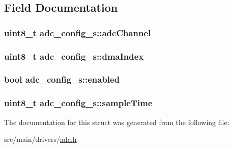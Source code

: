 \subsection{Field Documentation}
\hypertarget{structadc__config__s_a0a1d73295fd9feb39b84ffba25547cff}{
\subsubsection[{adc\+Channel}]{\setlength{\rightskip}{0pt plus 5cm}uint8\+\_\+t adc\+\_\+config\+\_\+s\+::adc\+Channel}}\label{structadc__config__s_a0a1d73295fd9feb39b84ffba25547cff}
\hypertarget{structadc__config__s_aeda4d4bb3b47c2f32be4e4cb985a083a}{
\subsubsection[{dma\+Index}]{\setlength{\rightskip}{0pt plus 5cm}uint8\+\_\+t adc\+\_\+config\+\_\+s\+::dma\+Index}}\label{structadc__config__s_aeda4d4bb3b47c2f32be4e4cb985a083a}
\hypertarget{structadc__config__s_a773d02e807e2f68e386ca29665ea8b84}{
\subsubsection[{enabled}]{\setlength{\rightskip}{0pt plus 5cm}bool adc\+\_\+config\+\_\+s\+::enabled}}\label{structadc__config__s_a773d02e807e2f68e386ca29665ea8b84}
\hypertarget{structadc__config__s_a2bd63c6ed63d7597726383225674f566}{
\subsubsection[{sample\+Time}]{\setlength{\rightskip}{0pt plus 5cm}uint8\+\_\+t adc\+\_\+config\+\_\+s\+::sample\+Time}}\label{structadc__config__s_a2bd63c6ed63d7597726383225674f566}


The documentation for this struct was generated from the following file\+:\begin{DoxyCompactItemize}
\item 
src/main/drivers/\hyperlink{adc_8h}{adc.\+h}\end{DoxyCompactItemize}
